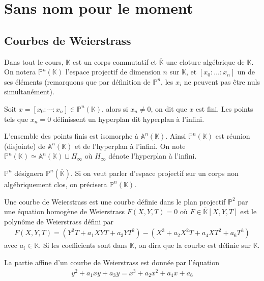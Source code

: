 \chapter{Sans nom pour le moment}
    \section{Courbes de Weierstrass}
        Dans tout le cours, $\mathbb{K}$ est un corps commutatif et $\overline{\mathbb{K}}$ une cloture algébrique de $\mathbb{K}$. On notera $\mathbb{P}^n(\mathbb{K})$ l'espace projectif de dimension $n$ sur $\mathbb{K}$, et $[x_0 : \dots : x_n]$ un de ses éléments (remarquons que par définition de $\mathbb{P}^n$, les $x_i$ ne peuvent pas être nuls simultanément).
        \begin{defi}
            Soit $x = [x_0 : \cdots : x_n] \in \mathbb{P}^n(\mathbb{K})$, alors si $x_n \neq 0$, on dit que $x$ est fini. Les points tels que $x_n = 0$ définissent un hyperplan dit hyperplan à l'infini.
        \end{defi}
        \begin{remq}
            L'ensemble des points finis est isomorphe à $\mathbb{A}^n(\mathbb{K})$. Ainsi $\mathbb{P}^n(\mathbb{K})$ est réunion (disjointe) de $\mathbb{A}^n(\mathbb{K})$ et de l'hyperplan à l'infini. On note $\mathbb{P}^n(\mathbb{K}) \simeq \mathbb{A}^n(\mathbb{K}) \sqcup H_{\infty}$ où $H_\infty$ dénote l'hyperplan à l'infini.
        \end{remq}
        \begin{nota}
            $\mathbb{P}^n$ désignera $\mathbb{P}^n(\overline{\mathbb{K}})$. Si on veut parler d'espace projectif sur un corps non algébriquement clos, on précisera $\mathbb{P}^n(\mathbb{K})$.
        \end{nota}
        \begin{defi}
            Une courbe de Weierstrass est une courbe définie dans le plan projectif $\mathbb{P}^2$ par une équation homogène de Weierstrass $F(X, Y, T) = 0$ où $F \in \overline{\mathbb{K}}[X, Y, T]$ est le polynôme de Weierstrass défini par 
            \begin{align*}
                F(X, Y, T) = (Y^2T + a_1XYT + a_3YT^2) - (X^3 + a_2X^2T + a_4XT^2 + a_6T^3)
            \end{align*}
            avec $a_i \in \overline{\mathbb{K}}$. Si les coefficients sont dans $\mathbb{K}$, on dira que la courbe est définie sur $\mathbb{K}$.
        \end{defi}
        \begin{remq}
            La partie affine d'un courbe de Weierstrass est donnée par l'équation
            \begin{align*}
                y^2 + a_1xy + a_3y = x^3 + a_2x^2 + a_4x + a_6
            \end{align*}
        \end{remq}
